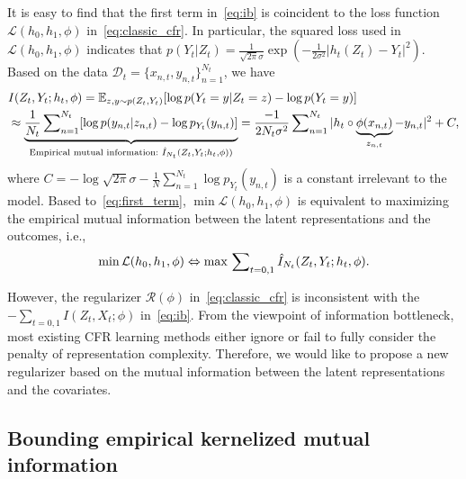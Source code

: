 \documentclass{article}
\begin{document}
It is easy to find that the first term in~\eqref{eq:ib} is coincident to the loss function $\mathcal{L}(h_0,h_1,\phi)$ in~\eqref{eq:classic_cfr}.
In particular, the squared loss used in $\mathcal{L}(h_0,h_1,\phi)$ indicates that $p(Y_t|Z_t)=\frac{1}{\sqrt{2\pi}\sigma}\exp(-\frac{1}{2\sigma^2}|h_t(Z_t)-Y_t|^2)$. 
Based on the data $\mathcal{D}_t=\{x_{n,t},y_{n,t}\}_{n=1}^{N_t}$, we have
\begin{eqnarray}\label{eq:first_term}
\begin{aligned}
    &I(Z_t,Y_t;h_t,\phi)=\mathbb{E}_{z,y\sim p(Z_t,Y_t)}[\log p(Y_t=y|Z_t=z) - \log p(Y_t=y)]\\
    &\approx \underbrace{\frac{1}{N_t}\sideset{}{_{n=1}^{N_t}}\sum [\log p(y_{n,t}|z_{n,t}) - \log p_{Y_t}(y_{n,t})]}_{\text{Empirical mutual information:~}\hat{I}_{N_t}(Z_t,Y_t;h_t,\phi))}
    =\frac{-1}{2N_t\sigma^2}\sideset{}{_{n=1}^{N_t}}\sum |h_t\circ\underbrace{\phi(x_{n,t})}_{z_{n,t}}-y_{n,t}|^2 + C,
\end{aligned}
\end{eqnarray}
where $C=-\log\sqrt{2\pi}\sigma-\frac{1}{N}\sum_{n=1}^{N_t}\log p_{Y_t}(y_{n,t})$ is a constant irrelevant to the model. 
Based to~\eqref{eq:first_term}, $\min \mathcal{L}(h_0,h_1,\phi)$ is equivalent to maximizing the empirical mutual information between the latent representations and the outcomes, i.e., 
\begin{eqnarray}
    \min\mathcal{L}(h_0,h_1,\phi)\Leftrightarrow \max \sideset{}{_{t=0,1}}\sum\hat{I}_{N_t}(Z_t,Y_t;h_t,\phi).
\end{eqnarray}

However, the regularizer $\mathcal{R}(\phi)$ in~\eqref{eq:classic_cfr} is inconsistent with the $-\sum_{t=0,1}I(Z_t,X_t;\phi)$ in~\eqref{eq:ib}.
From the viewpoint of information bottleneck, most existing CFR learning methods either ignore or fail to fully consider the penalty of representation complexity.
Therefore, we would like to propose a new regularizer based on the mutual information between the latent representations and the covariates. 

\subsection{Bounding empirical kernelized mutual information}
\end{document}
